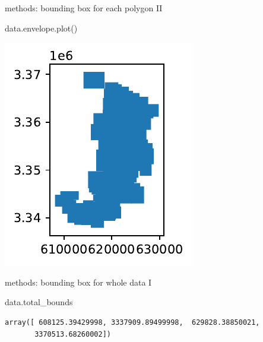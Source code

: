\documentclass[
  ignorenonframetext,
]{beamer}
\newenvironment{Shaded}{\begin{snugshade}}{\end{snugshade}}
\newcommand{\NormalTok}[1]{\textcolor[rgb]{0.00,0.23,0.31}{#1}}
\begin{document}
\begin{frame}[fragile]{methods: bounding box for each polygon II}
\label{methods-bounding-box-for-each-polygon-ii}
\begin{Shaded}
\begin{Highlighting}[]
\NormalTok{data.envelope.plot()}
\end{Highlighting}
\end{Shaded}

\includegraphics{spatial_2_files/figure-beamer/cell-20-output-1.pdf}
\end{frame}

\begin{frame}[fragile]{methods: bounding box for whole data I}
\label{methods-bounding-box-for-whole-data-i}
\begin{Shaded}
\begin{Highlighting}[]
\NormalTok{data.total\_bounds}
\end{Highlighting}
\end{Shaded}

\begin{verbatim}
array([ 608125.39429998, 3337909.89499998,  629828.38850021,
       3370513.68260002])
\end{verbatim}
\end{frame}
\end{document}
